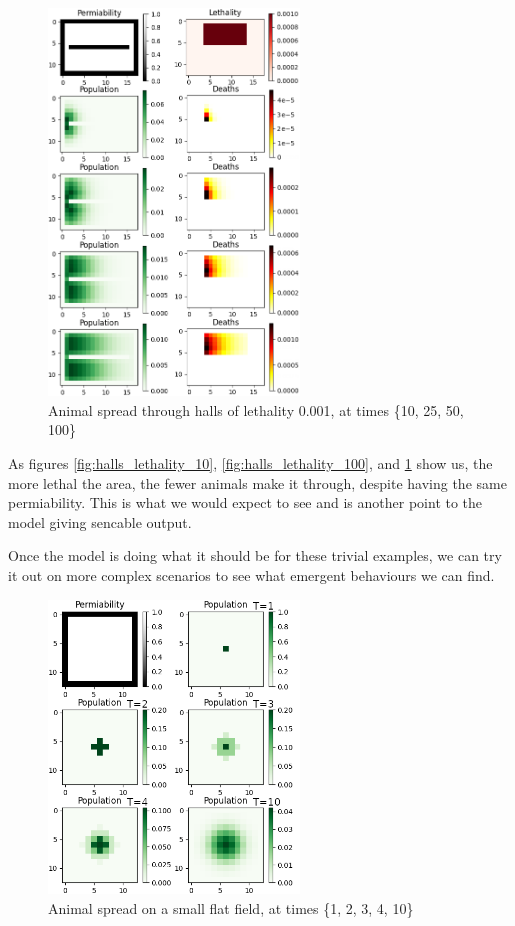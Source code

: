 \documentclass[twocolumn]{article}
\begin{document}
\begin{figure}[h!]
	\begin{center}
		\includegraphics[width=18em]{halls_lethality_1000.png}
		\caption{Animal spread through halls of lethality 0.001, at times \{10, 25, 50, 100\}}
		\label{fig:halls_lethality_1000}
	\end{center}
\end{figure}

As figures \ref{fig:halls_lethality_10}, \ref{fig:halls_lethality_100}, and \ref{fig:halls_lethality_1000} show us, the more lethal the area, the fewer animals make it through, despite having the same permiability. This is what we would expect to see and is another point to the model giving sencable output.

Once the model is doing what it should be for these trivial examples, we can try it out on more complex scenarios to see what emergent behaviours we can find.

\begin{figure}[h!]
	\begin{center}
		\includegraphics[width=18em]{small_flat_field.png}
		\caption{Animal spread on a small flat field, at times \{1, 2, 3, 4, 10\}}
		\label{fig:small_flat_field}
	\end{center}
\end{figure}
\end{document}

